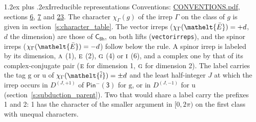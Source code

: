 \documentclass[10pt,a4paper]{article}
\makeatletter
\renewcommand\section{\@startsection{section}{1}{\z@}{-3ex plus -1ex minus -.2ex}%
  {1.2ex plus .2ex}{\normalfont\large\sffamily\bfseries\color{parttitle}}}
\numberwithin{equation}{section}
\newcommand{\eltfont}[1]{{\let\sigma\eltsigma\mathelt{#1}}}
\newcommand{\grp}[1]{\mathsf{#1}}
\newcommand{\irr}[1]{\text{\normalfont\scshape #1}}
\newcommand{\elt}[1]{\eltfont{#1}}
\newcommand{\ptag}[1]{\mathrm{#1}}
\newcommand{\irrJp}[2]{D^{(#1,#2)}}
\newcommand{\irchar}[1]{\chi_{#1}}
\newcommand{\barred}[1]{\bar{#1}}
\newcommand{\lift}[1]{\tilde{#1}}
\makeatother
\begin{document}
\section{Irreducible representations}\label{s:irreps}
Conventions: \href{../../CONVENTIONS.pdf}{CONVENTIONS.pdf}, sections \href{../../../rotation/CONVENTIONS.pdf\#conv.6}{6}, \href{../../../rotation/CONVENTIONS.pdf\#conv.7}{7} and \href{../../CONVENTIONS.pdf\#conv.23}{23}.
\leavevmode\label{n:function.character}\label{n:irrep.Gamma}The character $\irchar{\Gamma}(g)$ of the irrep $\Gamma$ on the class of $g$ is given in section~\ref{s:character_table}. \label{n:index.dimension}The vector irreps ($\irchar{\Gamma}(\elt{\barred{E}}) = +d$, $d$ the dimension) are those of \href{../../../rotation/data/pdf/C8h.pdf}{$\grp{C_{8h}}$}, on both lifts (\texttt{vectorirreps}), and the spinor irreps ($\irchar{\Gamma}(\elt{\barred{E}}) = -d$) follow below the rule. A spinor irrep is labeled by its dimension, $\irr{a}$ (1), $\irr{e}$ (2), $\irr{g}$ (4) or $\irr{i}$ (6), and a complex one by that of its complex-conjugate pair ($\irr{e}$ for dimension 1, $\irr{g}$ for dimension 2). The label carries the tag $\ptag{g}$ or $\ptag{u}$ of $\irchar{\Gamma}(\elt{\lift{i}}) = \pm d$ and the least half-integer $J$ at which the irrep occurs in $\irrJp{J}{+1}$ of $\grp{Pin^{-}(3)}$ for $\ptag{g}$, or in $\irrJp{J}{-1}$ for $\ptag{u}$ (section~\ref{s:subduction_parent}). Two that would share a label carry the prefixes 1 and 2: 1 has the character of the smaller argument in $[0, 2\pi)$ on the first class with unequal characters.
\end{document}

